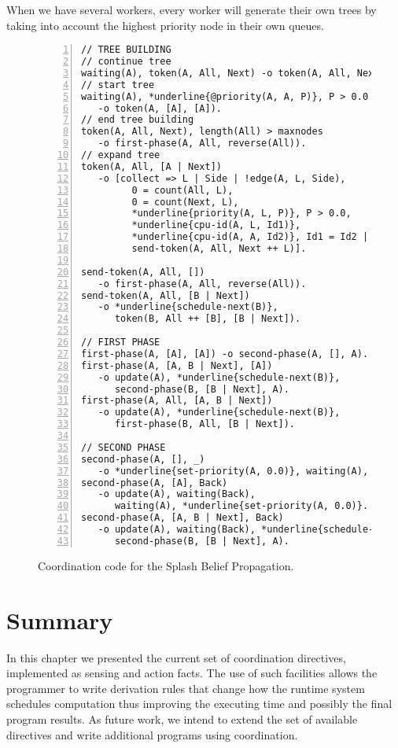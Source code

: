When we have several workers, every worker will generate their own trees by taking into account the highest priority node in their own queues.

\begin{figure}[h!]
\small\begin{Verbatim}[numbers=left,commandchars=*\{\}]
// TREE BUILDING
// continue tree
waiting(A), token(A, All, Next) -o token(A, All, Next).
// start tree
waiting(A), *underline{@priority(A, A, P)}, P > 0.0
   -o token(A, [A], [A]).
// end tree building
token(A, All, Next), length(All) > maxnodes
   -o first-phase(A, All, reverse(All)).
// expand tree
token(A, All, [A | Next])
   -o [collect => L | Side | !edge(A, L, Side),
         0 = count(All, L),
         0 = count(Next, L),
         *underline{priority(A, L, P)}, P > 0.0,
         *underline{cpu-id(A, L, Id1)},
         *underline{cpu-id(A, A, Id2)}, Id1 = Id2 |
         send-token(A, All, Next ++ L)].

send-token(A, All, [])
   -o first-phase(A, All, reverse(All)).
send-token(A, All, [B | Next])
   -o *underline{schedule-next(B)},
      token(B, All ++ [B], [B | Next]).

// FIRST PHASE
first-phase(A, [A], [A]) -o second-phase(A, [], A).
first-phase(A, [A, B | Next], [A])
   -o update(A), *underline{schedule-next(B)},
      second-phase(B, [B | Next], A).
first-phase(A, All, [A, B | Next])
   -o update(A), *underline{schedule-next(B)},
      first-phase(B, All, [B | Next]).

// SECOND PHASE
second-phase(A, [], _)
   -o *underline{set-priority(A, 0.0)}, waiting(A), update(A).
second-phase(A, [A], Back)
   -o update(A), waiting(Back),
      waiting(A), *underline{set-priority(A, 0.0)}.
second-phase(A, [A, B | Next], Back)
   -o update(A), waiting(Back), *underline{schedule-next(B)},
      second-phase(B, [B | Next], A).
\end{Verbatim}
  \caption{Coordination code for the Splash Belief Propagation.}
  \label{code:sbp}
\end{figure}
\normalsize

\section{Summary}

In this chapter we presented the current set of coordination directives, implemented as sensing and action facts. The use of such facilities allows the programmer to write derivation rules that change how
the runtime system schedules computation thus improving the executing time and possibly the final program
results. As future work, we intend to extend the set of available directives and write additional programs using coordination.